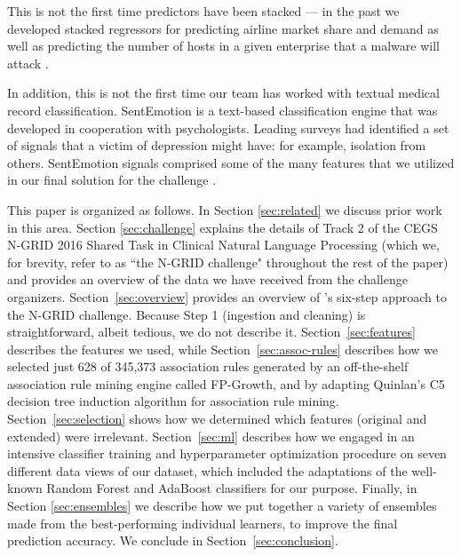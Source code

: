 This is not the first time predictors have been stacked --- in the past we developed stacked regressors for predicting airline market share and demand \cite{an2016map} as well as predicting the number of hosts in a given enterprise that a malware will attack 
\cite{kang2016ensemble}.

In addition, this is not the first time our team has worked with textual medical record classification. SentEmotion is a text-based classification engine that was developed in cooperation with psychologists. Leading surveys had identified a set of signals that a victim of depression might have: for example, isolation from others. SentEmotion signals comprised some of the many features that we utilized in our final solution for the challenge \cite{coptads}.

This paper is organized as follows. In Section \ref{sec:related} we discuss prior work in this area.  Section
\ref{sec:challenge} explains the details of Track 2 of the CEGS N-GRID 2016 Shared Task in Clinical Natural Language Processing (which we, for brevity, refer to as ``the N-GRID challenge"
throughout the rest of the paper) and provides an
overview of the data we have received from the challenge organizers.  
Section~\ref{sec:overview} provides an overview of \CREATE's six-step
approach to the N-GRID challenge.  Because Step 1 (ingestion and cleaning) is 
straightforward, albeit tedious, we do not describe it.
Section~\ref{sec:features} describes the features we used, while
Section~\ref{sec:assoc-rules} describes how we selected just 628 of 345,373 association rules  generated by an off-the-shelf association rule mining engine
called FP-Growth\cite{fpgrowth}, and by adapting Quinlan's C5 decision tree
induction algorithm \cite{c45,c5} for association rule mining. 
Section~\ref{sec:selection} shows how we determined 
which features (original and extended) were irrelevant.
Section~\ref{sec:ml} describes how  we engaged in an intensive classifier training and
hyperparameter optimization procedure on seven different data views of our dataset, 
which included the  adaptations of the well-known Random Forest and AdaBoost classifiers
for our purpose.  Finally, in Section \ref{sec:ensembles} we describe how we put together 
a variety of ensembles made from the best-performing individual learners, to 
improve the final prediction accuracy.
We conclude in Section~\ref{sec:conclusion}.
